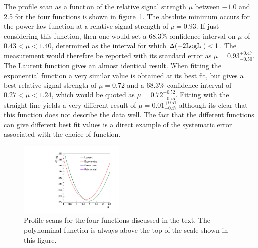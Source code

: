 The profile scan as a function of the relative signal strength $\mu$
between $-1.0$ and 2.5
for the four functions is shown in
figure~\ref{fig:functions:profiles}.
The absolute minimum occurs for the power law function at a relative signal 
strength of $\mu = 0.93$. If just considering this function,
then one would set a 68.3\% confidence interval on $\mu$ of  
$0.43 < \mu < 1.40 $, determined as the interval for which $\Delta({\rm -2LogL~}) < 1$. 
The measurement would therefore be reported with its standard error as $\mu=0.93^{+0.47}_{-0.50}$. The Laurent function gives an almost identical result.
When fitting the exponential function a very similar \nll value is obtained
at its best fit, but gives a best relative signal strength of $\mu = 0.72$
and a 68.3\% confidence interval of
$0.27 < \mu < 1.24 $, which would be quoted as $\mu = 0.72^{+0.52}_{-0.45}$.
Fitting with the straight line yields a very different result of 
$\mu = 0.01^{+0.51}_{-0.47}$ 
although its clear that this function does not describe the data well.
The fact that the different functions can give different best fit values
is a direct example of the systematic error associated
with the choice of function.
%
\begin{figure}[tbp]
\centering
\includegraphics[width=0.45\textwidth]{functions/Profiles.pdf}
\caption{Profile \nll scans for the four functions discussed in the text.
The polynominal function is always above the top of the \nll scale shown in this
figure. }
\label{fig:functions:profiles}
\end{figure}

